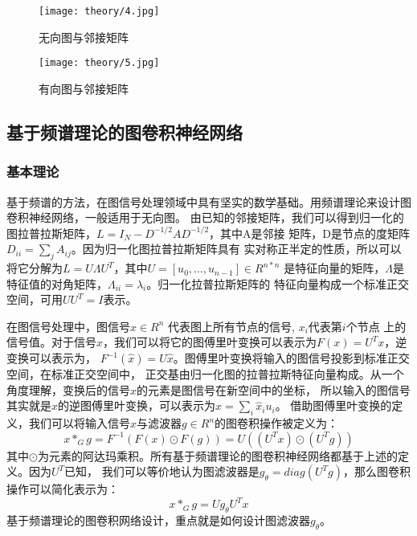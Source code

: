 \begin{figure}[htbp]
    \centering
    \begin{minipage}[t]{0.48\textwidth}
    \centering
    \captionsetup{width=5cm}
    \texttt{[image: theory/4.jpg]}
    \caption{\label{2-4}无向图与邻接矩阵}
    \end{minipage}
    \begin{minipage}[t]{0.48\textwidth}
    \centering
    \captionsetup{width=5cm}
    \texttt{[image: theory/5.jpg]}
    \caption{\label{2-5}有向图与邻接矩阵}
    \end{minipage}
\end{figure}

\subsection{基于频谱理论的图卷积神经网络}
\subsubsection{基本理论}
基于频谱的方法，在图信号处理领域中具有坚实的数学基础。用频谱理论来设计图卷积神经网络，一般适用于无向图。
由已知的邻接矩阵，我们可以得到归一化的图拉普拉斯矩阵，$ L=I_N-D^{-1/2}AD^{-1/2} $，其中A是邻接
矩阵，D是节点的度矩阵 $ D_{ii}={\sum_{j}} A_{ij} $。因为归一化图拉普拉斯矩阵具有
实对称正半定的性质，所以可以将它分解为$ L=U\Lambda U^T $，其中$ U=[u_0,\ldots,u_{n-1}] \in R^{n*n} $
是特征向量的矩阵，$ \Lambda $是特征值的对角矩阵，$\Lambda_{ii}=\lambda_{i} $。归一化拉普拉斯矩阵的
特征向量构成一个标准正交空间，可用$ UU^{T}=I $表示。

在图信号处理中，图信号$ x\in R^n $ 代表图上所有节点的信号, $ x_i $代表第$ i $个节点
上的信号值。对于信号$ x $，我们可以将它的图傅里叶变换可以表示为$ F(x)=U^{T}x $，逆变换可以表示为，
$ F^{-1} (\widehat{x}) = U\widehat{x} $。图傅里叶变换将输入的图信号投影到标准正交空间，在标准正交空间中，
正交基由归一化图的拉普拉斯特征向量构成。从一个角度理解，变换后的信号$ \widehat{x} $的元素是图信号在新空间中的坐标，
所以输入的图信号其实就是$ \widehat{x} $的逆图傅里叶变换，可以表示为$ x = {\sum_{i}}\widehat{x}_{i}u_{i} $。
借助图傅里叶变换的定义，我们可以将输入信号$ x $与滤波器$ g \in R^{n} $的图卷积操作被定义为：
$$ x\ast_{G}g = F^{-1}(F(x) \odot F(g)) = U((U^{T}x) \odot (U^{T}g)) $$
其中$ \odot $为元素的阿达玛乘积。所有基于频谱理论的图卷积神经网络都基于上述的定义。因为$U^{T}$已知，
我们可以等价地认为图滤波器是$ g_{\theta}=diag(U^{T}g) $，那么图卷积操作可以简化表示为：
$$ x\ast_{G}g = U g_{\theta} U^{T} x $$
基于频谱理论的图卷积网络设计，重点就是如何设计图滤波器$ g_{\theta} $。

